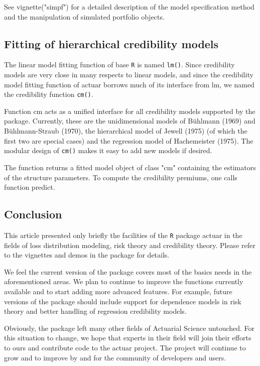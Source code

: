 \documentclass[12pt]{article}
\begin{document}
See vignette("simpf") for a detailed description of the model specification method and the manipulation of simulated portfolio objects.

\subsection{Fitting of hierarchical credibility models}

The linear model fitting function of base \texttt{R} is named \texttt{lm()}. Since credibility models are very close in many respects to linear models, and since the credibility model fitting function of actuar borrows much of its interface from lm, we named the credibility function \texttt{cm()}.

Function cm acts as a unified interface for all credibility models supported by the package. Currently, these are the unidimensional models of Bühlmann (1969) and Bühlmann-Straub (1970), the hierarchical model of Jewell (1975) (of which the first two are special cases) and the regression model of Hachemeister (1975). The modular design of \texttt{cm()} makes it easy to add new models if desired.

The function returns a fitted model object of class "cm" containing the estimators of the structure parameters. To compute the credibility premiums, one calls function predict.

\subsection{Conclusion}

This article presented only briefly the facilities of the \texttt{R} package actuar in the fields of loss distribution modeling, risk theory and credibility theory. Please refer to the vignettes and demos in the package for details.

We feel the current version of the package covers most of the basics needs in the aforementioned areas. We plan to continue to improve the functions currently available and to start adding more advanced features. For example, future versions of the package should include support for dependence models in risk theory and better handling of regression credibility models.

Obviously, the package left many other fields of Actuarial Science untouched. For this situation to change, we hope that experts in their field will join their efforts to ours and contribute code to the actuar project. The project will continue to grow and to improve by and for the community of developers and users.
\end{document}
